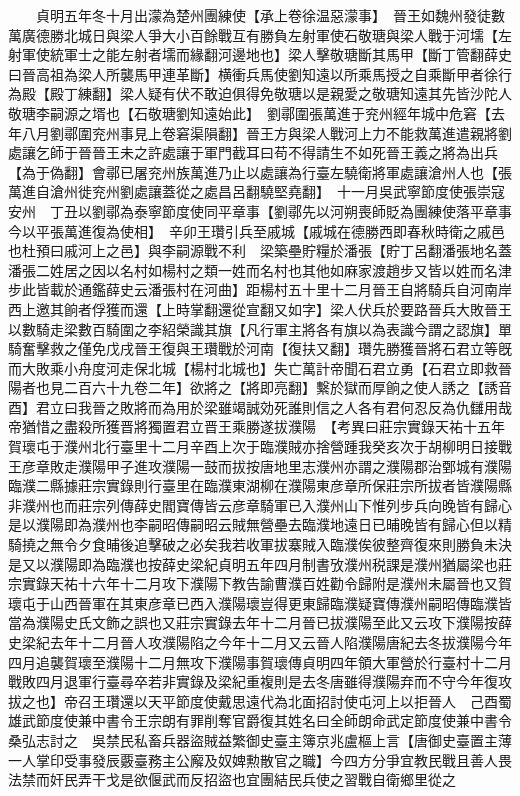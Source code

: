 　　貞明五年冬十月出濛為楚州團練使【承上卷徐温惡濛事】　晉王如魏州發徒數萬廣德勝北城日與梁人爭大小百餘戰互有勝負左射軍使石敬瑭與梁人戰于河壖【左射軍使統軍士之能左射者壖而緣翻河邊地也】梁人擊敬瑭斷其馬甲【斷丁管翻薛史曰晉高祖為梁人所襲馬甲連革斷】横衝兵馬使劉知遠以所乘馬授之自乘斷甲者徐行為殿【殿丁練翻】梁人疑有伏不敢迫俱得免敬瑭以是親愛之敬瑭知遠其先皆沙陀人敬瑭李嗣源之壻也【石敬瑭劉知遠始此】　劉鄩圍張萬進于兖州經年城中危窘【去年八月劉鄩圍兖州事見上卷窘渠隕翻】晉王方與梁人戰河上力不能救萬進遣親將劉處讓乞師于晉晉王未之許處讓于軍門截耳曰苟不得請生不如死晉王義之將為出兵【為于偽翻】會鄩已屠兖州族萬進乃止以處讓為行臺左驍衛將軍處讓滄州人也【張萬進自滄州徙兖州劉處讓蓋從之處昌呂翻驍堅堯翻】　十一月吳武寧節度使張崇寇安州　丁丑以劉鄩為泰寧節度使同平章事【劉鄩先以河朔喪師貶為團練使落平章事今以平張萬進復為使相】　辛卯王瓚引兵至戚城【戚城在德勝西即春秋時衛之戚邑也杜預曰戚河上之邑】與李嗣源戰不利　梁築壘貯糧於潘張【貯丁呂翻潘張地名蓋潘張二姓居之因以名村如楊村之類一姓而名村也其他如麻家渡趙步又皆以姓而名津步此皆載於通鑑薛史云潘張村在河曲】距楊村五十里十二月晉王自將騎兵自河南岸西上邀其餉者俘獲而還【上時掌翻還從宣翻又如字】梁人伏兵於要路晉兵大敗晉王以數騎走梁數百騎圍之李紹榮識其旗【凡行軍主將各有旗以為表識今謂之認旗】單騎奮擊救之僅免戊戌晉王復與王瓚戰於河南【復扶又翻】瓚先勝獲晉將石君立等旣而大敗乘小舟度河走保北城【楊村北城也】失亡萬計帝聞石君立勇【石君立即救晉陽者也見二百六十九卷二年】欲將之【將即亮翻】繫於獄而厚餉之使人誘之【誘音酉】君立曰我晉之敗將而為用於梁雖竭誠効死誰則信之人各有君何忍反為仇讎用哉帝猶惜之盡殺所獲晋將獨置君立晋王乘勝遂拔濮陽　【考異曰莊宗實錄天祐十五年賀瓌屯于濮州北行臺里十二月辛酉上次于臨濮賊亦捨營踵我癸亥次于胡柳明日接戰王彦章敗走濮陽甲子進攻濮陽一鼓而拔按唐地里志濮州亦謂之濮陽郡治鄄城有濮陽臨濮二縣據莊宗實錄則行臺里在臨濮東湖柳在濮陽東彦章所保莊宗所拔者皆濮陽縣非濮州也而莊宗列傳薛史閻寶傳皆云彦章騎軍已入濮州山下惟列步兵向晚皆有歸心是以濮陽即為濮州也李嗣昭傳嗣昭云賊無營壘去臨濮地遠日已晡晚皆有歸心但以精騎撓之無令夕食晡後追擊破之必矣我若收軍拔寨賊入臨濮俟彼整齊復來則勝負未決是又以濮陽即為臨濮也按薛史梁紀貞明五年四月制書攷濮州税課是濮州猶屬梁也莊宗實錄天祐十六年十二月攻下濮陽下教告諭曹濮百姓勸令歸附是濮州未屬晉也又賀瓌屯于山西晉軍在其東彦章已西入濮陽瓌豈得更東歸臨濮疑寶傳濮州嗣昭傳臨濮皆當為濮陽史氏文飾之誤也又莊宗實錄去年十二月晉已拔濮陽至此又云攻下濮陽按薛史梁紀去年十二月晉人攻濮陽陷之今年十二月又云晉人陷濮陽唐紀去冬拔濮陽今年四月追襲賀瓌至濮陽十二月無攻下濮陽事賀瓌傳貞明四年領大軍營於行臺村十二月戰敗四月退軍行臺尋卒若非實錄及梁紀重複則是去冬唐雖得濮陽弃而不守今年復攻拔之也】帝召王瓚還以天平節度使戴思遠代為北面招討使屯河上以拒晉人　己酉蜀雄武節度使兼中書令王宗朗有罪削奪官爵復其姓名曰全師朗命武定節度使兼中書令桑弘志討之　吳禁民私畜兵器盜賊益繁御史臺主簿京兆盧樞上言【唐御史臺置主薄一人掌印受事發辰覈臺務主公廨及奴婢勲散官之職】今四方分爭宜教民戰且善人畏法禁而奸民弄干戈是欲偃武而反招盜也宜團結民兵使之習戰自衛鄉里從之

